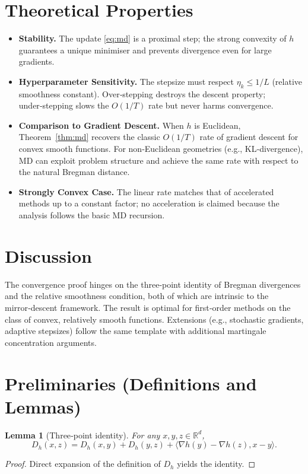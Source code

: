 \documentclass{article}
\newtheorem{lemma}{Lemma}
\newcommand{\Breg}{D_{h}}
\newcommand{\inner}[2]{\langle #1,#2\rangle}
\begin{document}
\section*{Theoretical Properties}
\begin{itemize}
\item \textbf{Stability.} The update \eqref{eq:md} is a proximal step; the strong convexity of $h$ guarantees a unique minimiser and prevents divergence even for large gradients.
\item \textbf{Hyperparameter Sensitivity.} The stepsize must respect $\eta_k\le 1/L$ (relative smoothness constant). Over‑stepping destroys the descent property; under‑stepping slows the $O(1/T)$ rate but never harms convergence.
\item \textbf{Comparison to Gradient Descent.} When $h$ is Euclidean, Theorem~\ref{thm:md} recovers the classic $O(1/T)$ rate of gradient descent for convex smooth functions. For non‑Euclidean geometries (e.g., KL‑divergence), MD can exploit problem structure and achieve the same rate with respect to the natural Bregman distance.
\item \textbf{Strongly Convex Case.} The linear rate matches that of accelerated methods up to a constant factor; no acceleration is claimed because the analysis follows the basic MD recursion.
\end{itemize}

\section*{Discussion}
The convergence proof hinges on the three‑point identity of Bregman divergences and the relative smoothness condition, both of which are intrinsic to the mirror‑descent framework. The result is optimal for first‑order methods on the class of convex, relatively smooth functions. Extensions (e.g., stochastic gradients, adaptive stepsizes) follow the same template with additional martingale concentration arguments.

\newpage
\section*{Preliminaries (Definitions and Lemmas)}
\begin{lemma}[Three‑point identity]\label{lem:three}
For any $x,y,z\in\mathbb{R}^{d}$,
\[
\Breg(x,z)=\Breg(x,y)+\Breg(y,z)+\inner{\nabla h(y)-\nabla h(z)}{x-y}.
\]
\end{lemma}
\begin{proof}
Direct expansion of the definition of $\Breg$ yields the identity. \hfill\qedsymbol
\end{proof}
\end{document}
